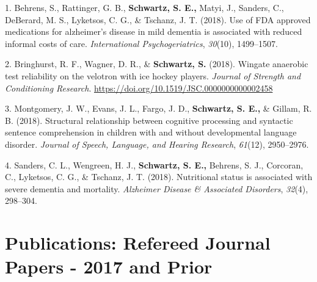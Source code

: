 \documentclass[11pt,a4paper,]{moderncv}
\newlength{\cslhangindent}
\newenvironment{CSLReferences}[2] %
 {\begin{list}{}{%
  \setlength{\itemindent}{0pt}
  \setlength{\leftmargin}{0pt}
  \setlength{\parsep}{0pt}
  \ifodd #1
   \setlength{\leftmargin}{\cslhangindent}
   \setlength{\itemindent}{-1\cslhangindent}
  \fi
  \setlength{\itemsep}{#2\baselineskip}}}
 {\end{list}}
\begin{document}
\label{refs-fe04386c4fef28ef7046087f03611967}
\begin{CSLReferences}{1}{0}
1. Behrens, S., Rattinger, G. B., \textbf{Schwartz, S. E.,} Matyi, J.,
Sanders, C., DeBerard, M. S., Lyketsos, C. G., \& Tschanz, J. T. (2018).
Use of FDA approved medications for alzheimer's disease in mild dementia
is associated with reduced informal costs of care. \emph{International
Psychogeriatrics}, \emph{30}(10), 1499--1507.

2. Bringhurst, R. F., Wagner, D. R., \& \textbf{Schwartz, S.} (2018).
Wingate anaerobic test reliability on the velotron with ice hockey
players. \emph{Journal of Strength and Conditioning Research}.
\url{https://doi.org/10.1519/JSC.0000000000002458}

3. Montgomery, J. W., Evans, J. L., Fargo, J. D.,
\textbf{Schwartz, S. E.,} \& Gillam, R. B. (2018). Structural
relationship between cognitive processing and syntactic sentence
comprehension in children with and without developmental language
disorder. \emph{Journal of Speech, Language, and Hearing Research},
\emph{61}(12), 2950--2976.

4. Sanders, C. L., Wengreen, H. J., \textbf{Schwartz, S. E.,} Behrens,
S. J., Corcoran, C., Lyketsos, C. G., \& Tschanz, J. T. (2018).
Nutritional status is associated with severe dementia and mortality.
\emph{Alzheimer Disease \& Associated Disorders}, \emph{32}(4),
298--304.

\end{CSLReferences}

\endgroup

\vspace{7mm}

\section{Publications: Refereed Journal Papers - 2017 and
Prior}\label{publications-refereed-journal-papers---2017-and-prior}

\begingroup
\setlength{\parindent}{-0.5in}
\setlength{\leftskip}{0.5in}
\end{document}
